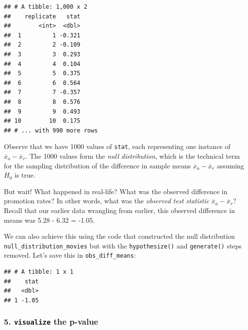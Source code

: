 \documentclass[
]{book}
\newenvironment{Shaded}{\begin{snugshade}}{\end{snugshade}}
\newcommand{\DataTypeTok}[1]{\textcolor[rgb]{0.13,0.29,0.53}{#1}}
\newcommand{\KeywordTok}[1]{\textcolor[rgb]{0.13,0.29,0.53}{\textbf{#1}}}
\newcommand{\NormalTok}[1]{#1}
\newcommand{\OperatorTok}[1]{\textcolor[rgb]{0.81,0.36,0.00}{\textbf{#1}}}
\newcommand{\StringTok}[1]{\textcolor[rgb]{0.31,0.60,0.02}{#1}}
\begin{document}
\begin{verbatim}
## # A tibble: 1,000 x 2
##    replicate   stat
##        <int>  <dbl>
##  1         1 -0.321
##  2         2 -0.109
##  3         3  0.293
##  4         4  0.104
##  5         5  0.375
##  6         6  0.564
##  7         7 -0.357
##  8         8  0.576
##  9         9  0.493
## 10        10  0.175
## # ... with 990 more rows
\end{verbatim}

Observe that we have 1000 values of \texttt{stat}, each representing one instance of \(\overline{x}_{a} - \overline{x}_{r}\). The 1000 values form the \emph{null distribution}, which is the technical term for the sampling distribution of the difference in sample means \(\overline{x}_{a} - \overline{x}_{r}\) assuming \(H_0\) is true.

But wait! What happened in real-life? What was the observed difference in promotion rates? In other words, what was the \emph{observed test statistic} \(\overline{x}_{a} - \overline{x}_{r}\)? Recall that our earlier data wrangling from earlier, this observed difference in means was 5.28 - 6.32 = -1.05.

We can also achieve this using the code that constructed the null distribution \texttt{null\_distribution\_movies} but with the \texttt{hypothesize()} and \texttt{generate()} steps removed. Let's save this in \texttt{obs\_diff\_means}:

\begin{Shaded}
\end{Shaded}

\begin{verbatim}
## # A tibble: 1 x 1
##    stat
##   <dbl>
## 1 -1.05
\end{verbatim}

\hypertarget{visualize-the-p-value-1}{%
\subsubsection*{\texorpdfstring{5. \texttt{visualize} the p-value}{5. visualize the p-value}}\label{visualize-the-p-value-1}}
\end{document}
